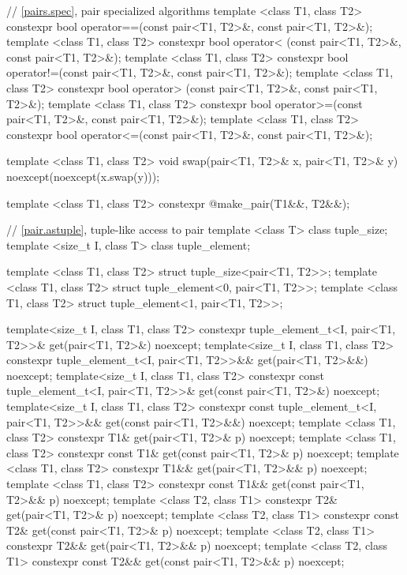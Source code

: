 \begin{codeblock}
{  // \ref{pairs.spec}, pair specialized algorithms
  template <class T1, class T2>
    constexpr bool operator==(const pair<T1, T2>&, const pair<T1, T2>&);
  template <class T1, class T2>
    constexpr bool operator< (const pair<T1, T2>&, const pair<T1, T2>&);
  template <class T1, class T2>
    constexpr bool operator!=(const pair<T1, T2>&, const pair<T1, T2>&);
  template <class T1, class T2>
    constexpr bool operator> (const pair<T1, T2>&, const pair<T1, T2>&);
  template <class T1, class T2>
    constexpr bool operator>=(const pair<T1, T2>&, const pair<T1, T2>&);
  template <class T1, class T2>
    constexpr bool operator<=(const pair<T1, T2>&, const pair<T1, T2>&);

  template <class T1, class T2>
    void swap(pair<T1, T2>& x, pair<T1, T2>& y) noexcept(noexcept(x.swap(y)));

  template <class T1, class T2>
    constexpr @\seebelow@ make_pair(T1&&, T2&&);

  // \ref{pair.astuple}, tuple-like access to pair
  template <class T> class tuple_size;
  template <size_t I, class T> class tuple_element;

  template <class T1, class T2> struct tuple_size<pair<T1, T2>>;
  template <class T1, class T2> struct tuple_element<0, pair<T1, T2>>;
  template <class T1, class T2> struct tuple_element<1, pair<T1, T2>>;

  template<size_t I, class T1, class T2>
    constexpr tuple_element_t<I, pair<T1, T2>>& get(pair<T1, T2>&) noexcept;
  template<size_t I, class T1, class T2>
    constexpr tuple_element_t<I, pair<T1, T2>>&& get(pair<T1, T2>&&) noexcept;
  template<size_t I, class T1, class T2>
    constexpr const tuple_element_t<I, pair<T1, T2>>& get(const pair<T1, T2>&) noexcept;
  template<size_t I, class T1, class T2>
    constexpr const tuple_element_t<I, pair<T1, T2>>&& get(const pair<T1, T2>&&) noexcept;
  template <class T1, class T2>
    constexpr T1& get(pair<T1, T2>& p) noexcept;
  template <class T1, class T2>
    constexpr const T1& get(const pair<T1, T2>& p) noexcept;
  template <class T1, class T2>
    constexpr T1&& get(pair<T1, T2>&& p) noexcept;
  template <class T1, class T2>
    constexpr const T1&& get(const pair<T1, T2>&& p) noexcept;
  template <class T2, class T1>
    constexpr T2& get(pair<T1, T2>& p) noexcept;
  template <class T2, class T1>
    constexpr const T2& get(const pair<T1, T2>& p) noexcept;
  template <class T2, class T1>
    constexpr T2&& get(pair<T1, T2>&& p) noexcept;
  template <class T2, class T1>
    constexpr const T2&& get(const pair<T1, T2>&& p) noexcept;

}
\end{codeblock}
